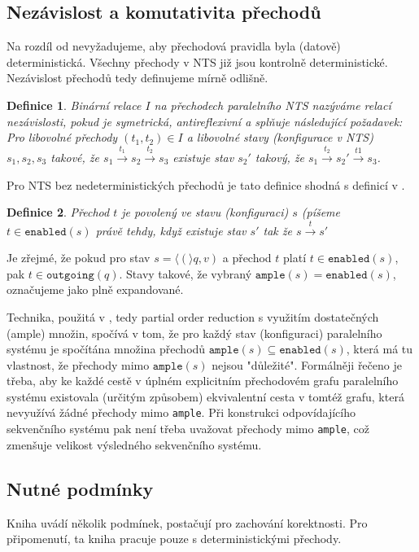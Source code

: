 \documentclass[10pt,a4paper,notitlepage]{report}
\newtheorem{definition}{Definice}
\newcommand{\tuple}[1]{\langle #1 \rangle}
\begin{document}
\subsection{Nezávislost a komutativita přechodů}
Na rozdíl od \cite{CLARKE} nevyžadujeme, aby přechodová pravidla byla (datově) deterministická. Všechny přechody v NTS již jsou kontrolně deterministické. Nezávislost přechodů tedy definujeme mírně odlišně.
\begin{definition}
Binární relace $I$ na přechodech paralelního NTS nazýváme relací nezávislosti, pokud je symetrická, antireflexivní a splňuje následující požadavek:
Pro libovolné přechody $(t_1, t_2) \in I$ a libovolné stavy (konfigurace v NTS) $s_1, s_2, s_3$ takové, že  $s_1 \xrightarrow{t_1} s_2 \xrightarrow{t_2} s_3$ existuje stav $s_2'$ takový, že $s_1 \xrightarrow{t_2} s_2' \xrightarrow{t1} s_3$.
\end{definition}
Pro NTS bez nedeterministických přechodů je tato definice shodná s definicí v \cite{CLARKE}.

\begin{definition}
Přechod $t$ je povolený ve stavu (konfiguraci) $s$ (píšeme $t \in \texttt{enabled}(s)$ právě tehdy, když existuje stav $s'$ tak že $s \xrightarrow{t} s'$
\end{definition}
Je zřejmé, že pokud pro stav $s = \tuple(q, v)$ a přechod $t$ platí $t \in \texttt{enabled}(s)$, pak $t \in \texttt{outgoing}(q)$. Stavy takové, že vybraný $\texttt{ample}(s) = \texttt{enabled}(s)$, označujeme jako plně expandované.

Technika, použitá v \cite{CLARKE}, tedy partial order reduction s využitím dostatečných (ample) množin, spočívá v tom, že pro každý stav (konfiguraci) paralelního systému je spočítána množina přechodů $\texttt{ample}(s) \subseteq \texttt{enabled}(s)$, která má tu vlastnost, že přechody mimo $\texttt{ample}(s)$ nejsou "důležité". Formálněji řečeno je třeba, aby ke každé cestě v úplném explicitním přechodovém grafu paralelního systému existovala (určitým způsobem) ekvivalentní cesta v tomtéž grafu, která nevyužívá žádné přechody mimo \texttt{ample}. Při konstrukci odpovídajícího sekvenčního systému pak není třeba uvažovat přechody mimo \texttt{ample}, což zmenšuje velikost výsledného sekvenčního systému.

\subsection{Nutné podmínky}
Kniha \cite{CLARKE} uvádí několik podmínek, postačují pro zachování korektnosti. Pro připomenutí, ta kniha pracuje pouze s deterministickými přechody. 
\end{document}
